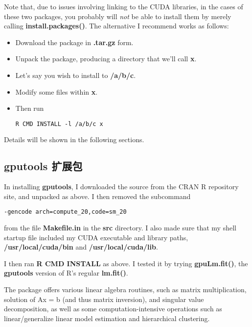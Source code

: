 Note that, due to issues involving linking to the CUDA libraries, in
the cases of these two packages, you probably will {\it not} be able to
install them by merely calling {\bf install.packages()}.   The
alternative I recommend works as follows:

\begin{itemize}

\item Download the package in {\bf .tar.gz} form.

\item Unpack the package, producing a directory that we'll call {\bf x}.

\item Let's say you wish to install to {\bf /a/b/c}.

\item Modify some files within {\bf x}.

\item Then run

\begin{lstlisting}
R CMD INSTALL -l /a/b/c x
\end{lstlisting}

\end{itemize}

Details will be shown in the following sections.

\subsection{gputools 扩展包}

In installing {\bf gputools}, I downloaded the source from the CRAN R
repository site, and unpacked as above.  I then removed the subcommand

\begin{verbatim}
-gencode arch=compute_20,code=sm_20
\end{verbatim}

from the file {\bf Makefile.in} in the {\bf src} directory.  I also
made sure that my shell startup file included my CUDA executable and
library paths, {\bf /usr/local/cuda/bin} and {\bf /usr/local/cuda/lib}.

I then ran {\bf R CMD INSTALL} as above.  I tested it by trying
{\bf gpuLm.fit()}, the {\bf gputools} version of R's regular {\bf
lm.fit()}.

The package offers various linear algebra routines, such as matrix
multiplication, solution of Ax = b (and thus matrix inversion), and
singular value decomposition, as well as some computation-intensive
operations such as linear/generalize linear model estimation and
hierarchical clustering.

